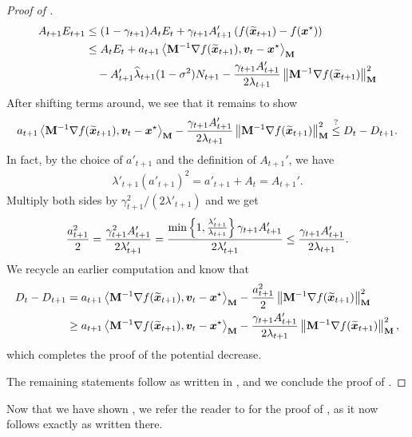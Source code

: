 \begin{proof}[Proof of ]
\begin{align*}
    A_{t+1}E_{t+1} &\le (1-\gamma_{t+1})A_tE_t + \gamma_{t+1}A_{t+1}'\left(f(\widetilde{\bm{x}}_{t+1})-f(\bm{x}^{\star})\right) \\
    &\le A_tE_t + a_{t+1}\left\langle \mathbf{M}^{-1}\nabla f(\widetilde{\bm{x}}_{t+1}), \bm{v}_t-\bm{x}^{\star} \right\rangle_{\mathbf{M}}\\
    &\quad -A_{t+1}'\widehat{\lambda}_{t+1}(1-\sigma^2)N_{t+1}-\frac{\gamma_{t+1}A_{t+1}'}{2\lambda_{t+1}}\left\lVert \mathbf{M}^{-1}\nabla f(\widetilde{\bm{x}}_{t+1}) \right\rVert_{\mathbf{M}}^2
\end{align*}
After shifting terms around, we see that it remains to show
\begin{align*}
    a_{t+1}\left\langle \mathbf{M}^{-1}\nabla f(\widetilde{\bm{x}}_{t+1}), \bm{v}_t-\bm{x}^{\star} \right\rangle_{\mathbf{M}}-\frac{\gamma_{t+1}A_{t+1}'}{2\lambda_{t+1}}\left\lVert \mathbf{M}^{-1}\nabla f(\widetilde{\bm{x}}_{t+1}) \right\rVert_{\mathbf{M}}^2 \overset{?}{\le} D_t-D_{t+1}.
\end{align*}
In fact, by the choice of $a'_{t+1}$ and the definition of $A_{t+1}'$, we have
\begin{align*}
    \lambda'_{t+1}(a'_{t+1})^2=a'_{t+1}+A_{t}=A_{t+1}'.
\end{align*}
Multiply both sides by $\gamma_{t+1}^2/(2\lambda'_{t+1})$ and we get
\begin{align*}
    \frac{a_{t+1}^2}{2}=\frac{\gamma_{t+1}^2A_{t+1}'}{2\lambda'_{t+1}} = \frac{\min\left\{1,\frac{\lambda_{t+1}'}{\lambda_{t+1}}\right\}\gamma_{t+1}A_{t+1}'}{2\lambda'_{t+1}} \le \frac{\gamma_{t+1}A_{t+1}'}{2\lambda_{t+1}}.
\end{align*}
We recycle an earlier computation and know that
\begin{align*}
    D_t-D_{t+1} &= a_{t+1}\left\langle \mathbf{M}^{-1}\nabla f(\widetilde{\bm{x}}_{t+1}), \bm{v}_t-\bm{x}^{\star} \right\rangle_{\mathbf{M}} - \frac{a_{t+1}^2}{2}\left\lVert \mathbf{M}^{-1}\nabla f(\widetilde{\bm{x}}_{t+1}) \right\rVert_{\mathbf{M}}^2 \\
    &\ge a_{t+1}\left\langle \mathbf{M}^{-1}\nabla f(\widetilde{\bm{x}}_{t+1}), \bm{v}_t-\bm{x}^{\star} \right\rangle_{\mathbf{M}}-\frac{\gamma_{t+1}A_{t+1}'}{2\lambda_{t+1}}\left\lVert \mathbf{M}^{-1}\nabla f(\widetilde{\bm{x}}_{t+1}) \right\rVert_{\mathbf{M}}^2,
\end{align*}
which completes the proof of the potential decrease.

The remaining statements follow as written in \cite[Proof of Proposition 1]{chjjs22}, and we conclude the proof of .
\end{proof}

Now that we have shown , we refer the reader to \cite[Appendix A]{chjjs22} for the proof of , as it now follows exactly as written there.

